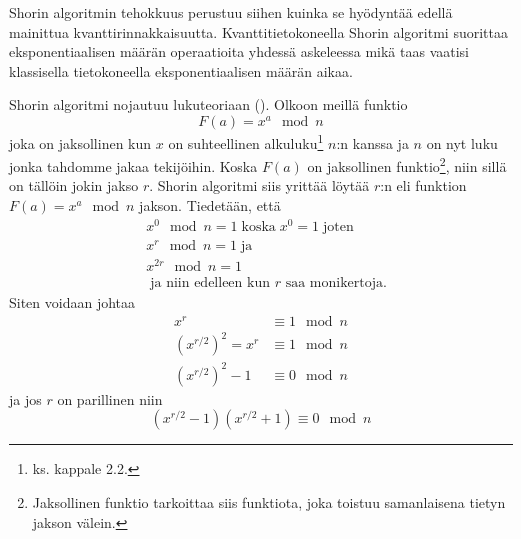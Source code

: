 Shorin algoritmin tehokkuus perustuu siihen kuinka se hyödyntää edellä mainittua kvanttirinnakkaisuutta. Kvanttitietokoneella Shorin algoritmi suorittaa eksponentiaalisen määrän operaatioita yhdessä askeleessa mikä taas vaatisi klassisella tietokoneella eksponentiaalisen määrän aikaa.



\iffalse
Shorin algoritmi nojautuu lukuteoriaan (\cite{hayward2008quantum}). Olkoon meillä funktio \[F(a) = x^{a} \mod n\]
joka on jaksollinen\footnote{Jaksollinen funktio tarkoittaa funktiota, joka toistuu samanlaisena tietyn jakson välein.} kun $x$ on suhteellinen alkuluku\footnote{ks. kappale 2.2.} $n$:n kanssa ja $n$ on nyt luku jonka haluamme jakaa tekijöihin. Koska $F(a)$ on jaksollinen niin sillä on tällöin jokin jakso $r$. 
\fi

\iffalse
Shorin algoritmi nojautuu lukuteoriaan (\cite{hayward2008quantum}). %
Olkoon meillä funktio
\begin{equation}
    \label{eq1}
    F(a) = x^{a} \mod n
\end{equation}
joka on jaksollinen kun $x$ on suhteellinen alkuluku\footnote{ks. kappale 2.2.} $n$:n kanssa ja $n$ on nyt luku jonka tahdomme jakaa tekijöihin. Koska $F(a)$ on jaksollinen funktio\footnote{Jaksollinen funktio tarkoittaa siis funktiota, joka toistuu samanlaisena tietyn jakson välein.}, niin sillä on tällöin jokin jakso $r$. Shorin algoritmi siis yrittää löytää $r$:n eli funktion $F(a) = x^{a} \mod n$ jakson. Tiedetään, että 
\begin{equation}
    \label{eq2}
    \begin{split}
    & x^{0} \mod n = 1 \; \text{koska} \;  x^0 = 1 \; \text{joten} \\
    & x^{r} \mod n = 1 \; \text{ja} \\
    & x^{2r} \mod n = 1 \\
    & \; \text{ja niin edelleen kun $r$ saa monikertoja.}
    \end{split}
\end{equation}
Siten voidaan johtaa
\begin{equation}
    \label{eq3}
    \begin{split}
    x^{r} & \equiv 1 \mod n \\
    (x^{r/2})^{2} = x^{r} & \equiv 1 \mod n \\
    (x^{r/2})^{2} - 1 & \equiv 0 \mod n
    \end{split}
\end{equation}
ja jos $r$ on parillinen niin
\begin{equation}
    \label{eq4}
    (x^{r/2} - 1)(x^{r/2} + 1) \equiv 0 \mod n
\end{equation}

